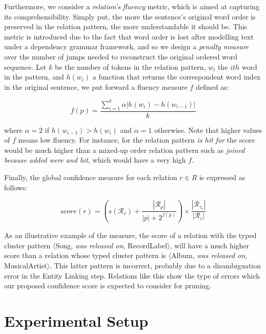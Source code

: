 Furthermore, we consider a \textit{relation's fluency} metric, which is aimed at capturing its comprehensibility. Simply put, the more the sentence's original word order is preserved in the relation pattern, the more understandable it should be. This metric is introduced due to the fact that word order is lost after modelling text under a dependency grammar framework, and so we design a \textit{penalty measure} over the number of jumps needed to reconstruct the original ordered word sequence. Let $k$ be the number of tokens in the relation pattern, $w_i$ the $ith$ word in the pattern, and $h(w_i)$ a function that returns the correspondent word index in the original sentence, we put forward a fluency measure $f$ defined as:

\begin{equation}
f(p) = \frac{\sum_{i=1}^{k} \alpha | h(w_i) - h(w_{i-1}) |}{k}
\end{equation}

where $\alpha=2$ if $h(w_{i-1}) > h(w_i)$ and $\alpha=1$ otherwise. Note that higher values of $f$ means low fluency. For instance, for the relation pattern \textit{is hit for} the score would be much higher than a mixed-up order relation pattern such as \textit{joined because added were and hit}, which would have a very high $f$.  

Finally, the global confidence measure for each relation $r \in R$ is expressed as follows:

\begin{equation}
score(r) = \left({s(\mathcal{R}_c) + \frac{|\mathcal{R}_p|}{|p|+2^{f(p)}}}\right) \times {\frac{|\mathcal{R}_{\tau_c}|}{|\mathcal{R}_c|}}
\end{equation}

As an illustrative example of the measure, the score of a relation with the typed cluster pattern $\langle$Song, \textit{was released on}, RecordLabel$\rangle$, will have a much higher score than a relation whose typed cluster pattern is $\langle$Album, \textit{was released on}, MusicalArtist$\rangle$. This latter pattern is incorrect, probably due to a disambiguation error in the Entity Linking step. Relations like this show the type of errors which our proposed confidence score is expected to consider for pruning.



\section{Experimental Setup}\label{sec:kb:exp}

